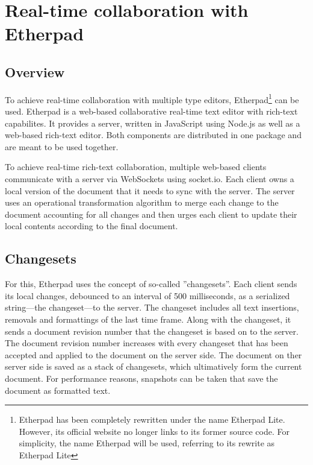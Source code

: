 \section{Real-time collaboration with Etherpad} 
\label{sec:etherpad}

\subsection{Overview}

To achieve real-time collaboration with multiple type editors, Etherpad\footnote{Etherpad has been completely rewritten under the name Etherpad Lite. However, its official website no longer links to its former source code. For simplicity, the name Etherpad will be used, referring to its rewrite as Etherpad Lite} can be used. Etherpad is a web-based collaborative real-time text editor with rich-text capabilites. It provides a server, written in JavaScript using Node.js as well as a web-based rich-text editor. Both components are distributed in one package and are meant to be used together.

To achieve real-time rich-text collaboration, multiple web-based clients communicate with a server via WebSockets using socket.io. Each client owns a local version of the document that it needs to sync with the server. The server uses an operational transformation algorithm to merge each change to the document accounting for all changes and then urges each client to update their local contents according to the final document.

\subsection{Changesets}

For this, Etherpad uses the concept of so-called ''changesets''. Each client sends its local changes, debounced to an interval of 500 milliseconds, as a serialized string---the changeset---to the server. The changeset includes all text insertions, removals and formattings of the last time frame. Along with the changeset, it sends a document revision number that the changeset is based on to the server. The document revision number increases with every changeset that has been accepted and applied to the document on the server side. The document on ther server side is saved as a stack of changesets, which ultimatively form the current document. For performance reasons, snapshots can be taken that save the document as formatted text. 

